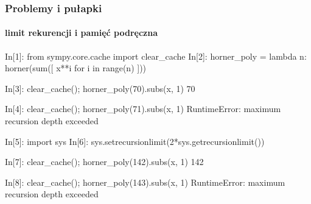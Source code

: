 \documentclass[10pt]{beamer}
\begin{document}
\begin{frame}[fragile]
  \frametitle{Problemy i pułapki}
  \framesubtitle{limit rekurencji i pamięć podręczna}

  \begin{python}
    In[1]: from sympy.core.cache import clear_cache
    In[2]: horner_poly = lambda n: horner(sum([ x**i for i in range(n) ]))
  \end{python}

  \begin{python}
    In[3]: clear_cache(); horner_poly(70).subs(x, 1)
    70
  \end{python}

  \begin{python}
    In[4]: clear_cache(); horner_poly(71).subs(x, 1)
    RuntimeError: maximum recursion depth exceeded
  \end{python}

  \pause

  \begin{python}
    In[5]: import sys
    In[6]: sys.setrecursionlimit(2*sys.getrecursionlimit())
  \end{python}

  \begin{python}
    In[7]: clear_cache(); horner_poly(142).subs(x, 1)
    142
  \end{python}

  \begin{python}
    In[8]: clear_cache(); horner_poly(143).subs(x, 1)
    RuntimeError: maximum recursion depth exceeded
  \end{python}
\end{frame}
\end{document}
